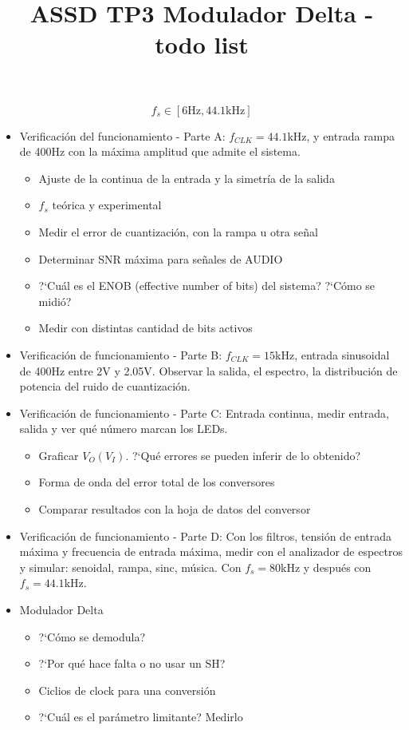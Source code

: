 \documentclass[a4paper]{article}
\date{}
\author{}
\title{ASSD TP3 Modulador Delta - todo list}
\begin{document}
\maketitle

\begin{equation}
	f_s \in [6\text{Hz}, 44.1\text{kHz}]
\end{equation}



\begin{itemize}

	\item Verificaci\'on del funcionamiento - Parte A:
	$f_{CLK} = 44.1$kHz, 
	y entrada rampa de 400Hz con la m\'axima amplitud que admite el sistema.

	\begin{itemize}
		\item Ajuste de la continua de la entrada y la simetr\'ia de la salida
		\item $f_s$ te\'orica y experimental
		\item Medir el error de cuantizaci\'on, con la rampa u otra se\~nal
		\item Determinar SNR m\'axima para se\~nales de AUDIO
		\item ?`Cu\'al  es el ENOB (effective number of bits) del sistema? 
				?`C\'omo se midi\'o? 
		\item Medir con distintas cantidad de bits activos
	\end{itemize}

	
	\item Verificaci\'on de funcionamiento - Parte B:
	$f_{CLK} = 15$kHz, entrada sinusoidal de 400Hz entre 2V y 2.05V. 
	Observar la salida, el espectro, la distribuci\'on de potencia del ruido de 
	cuantizaci\'on.
	
	
	\item Verificaci\'on de funcionamiento - Parte C:
	Entrada continua, medir entrada, salida y ver qu\'e n\'umero marcan los LEDs.
	\begin{itemize}
		\item Graficar $V_O ( V_I )$. 
		?`Qu\'e errores se pueden inferir de lo obtenido?
		\item Forma de onda del error total de los conversores	
		\item Comparar resultados con la hoja de datos del conversor
	\end{itemize}		

	
	\item Verificaci\'on de funcionamiento - Parte D:
	Con los filtros, tensi\'on de entrada m\'axima y frecuencia de entrada m\'axima, medir 	
	con el analizador de espectros y simular: senoidal, rampa, sinc, m\'usica.  Con 
	$f_s = 80$kHz y despu\'es con $f_s=44.1$kHz.
	
	
	\item Modulador Delta
	\begin{itemize}
		\item ?`C\'omo se demodula?
		\item ?`Por qu\'e hace falta o no usar un SH?
		\item Ciclios de clock para una conversi\'on
		\item ?`Cu\'al es el par\'ametro limitante? Medirlo
	\end{itemize}
\end{itemize}
\end{document}
